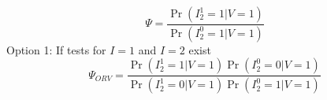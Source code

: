 \begin{appendix}
\begin{equation*}
    \Psi = \dfrac{\Pr(I^1_2 = 1 | V = 1)}{\Pr(I^0_2 = 1| V = 1)}
\end{equation*}
Option 1: If tests for $I=1$ and $I=2$ exist 
\begin{equation*}
    \Psi_{ORV} = \dfrac{\Pr(I^1_2 = 1 | V = 1)\Pr(I^0_2 = 0| V = 1)}{\Pr(I^1_2 = 0| V = 1)\Pr(I^0_2 = 1| V = 1)}
\end{equation*}

\end{appendix}
